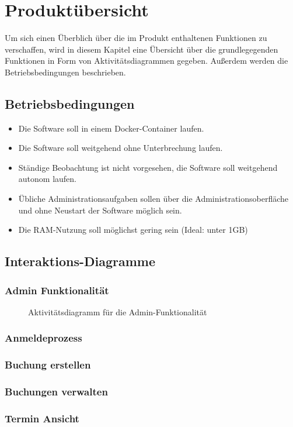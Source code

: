 
\chapter{Produktübersicht}
\label{chap:product_overview}
Um sich einen Überblich über die im Produkt enthaltenen Funktionen zu verschaffen, wird in diesem Kapitel eine Übersicht über die grundlegegenden Funktionen in Form von Aktivitätsdiagrammen gegeben.
Außerdem werden die Betriebsbedingungen beschrieben.
\section{Betriebsbedingungen}
\begin{itemize}
    \item Die Software soll in einem \gls{Docker}-\gls{Container} laufen.
    \item Die Software soll weitgehend ohne Unterbrechung laufen.
    \item Ständige Beobachtung ist nicht vorgesehen, die Software soll weitgehend autonom laufen.
    \item Übliche Administrationsaufgaben sollen über die Administrationsoberfläche und ohne Neustart der Software möglich sein.
    \item Die \gls{RAM}-Nutzung soll möglichst gering sein (Ideal: unter 1GB)
\end{itemize}


\section{Interaktions-Diagramme}

\subsection{Admin Funktionalität}
\begin{figure}
    \centering
    \caption{Aktivitätsdiagramm für die Admin-Funktionalität}
    \label{fig:activity_diagram_admin}
\end{figure}

\clearpage

\subsection{Anmeldeprozess}

\subsection{Buchung erstellen}

\subsection{Buchungen verwalten}
\subsection{Termin Ansicht}